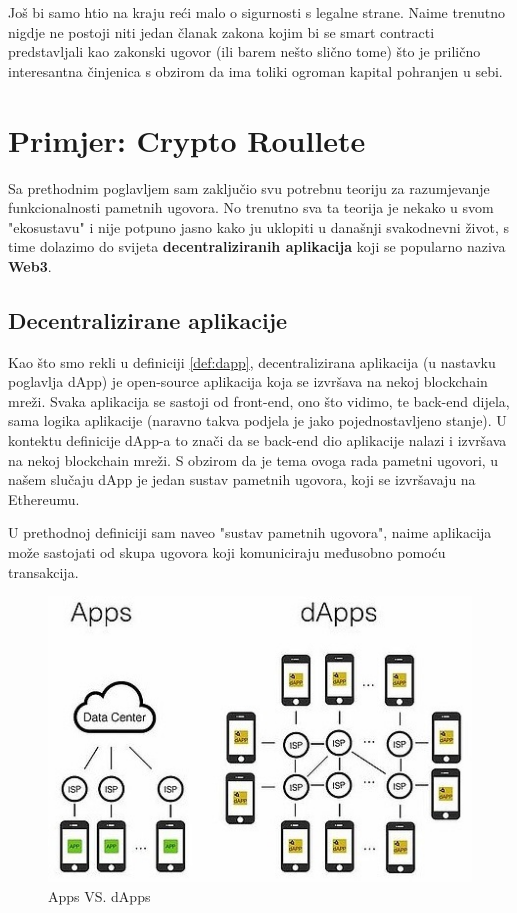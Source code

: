 \documentclass[12pt]{report}
\begin{document}
Još bi samo htio na kraju reći malo o sigurnosti s legalne strane. Naime trenutno nigdje ne postoji niti jedan članak zakona kojim bi se smart contracti predstavljali kao zakonski ugovor (ili barem nešto slično tome) što je prilično interesantna činjenica s obzirom da ima toliki ogroman kapital pohranjen u sebi.
    
\chapter{Primjer: Crypto Roullete}

Sa prethodnim poglavljem sam zaključio svu potrebnu teoriju za razumjevanje funkcionalnosti pametnih ugovora. No trenutno sva ta teorija je nekako u svom "ekosustavu" i nije potpuno jasno kako ju uklopiti u današnji svakodnevni život, s time dolazimo do svijeta \textbf{decentraliziranih aplikacija} koji se popularno naziva \textbf{Web3}.

\section{Decentralizirane aplikacije}

Kao što smo rekli u definiciji \ref{def:dapp}, decentralizirana aplikacija (u nastavku poglavlja dApp) je open-source aplikacija koja se izvršava na nekoj blockchain mreži. Svaka aplikacija se sastoji od front-end, ono što vidimo, te back-end dijela, sama logika aplikacije (naravno takva podjela je jako pojednostavljeno stanje). U kontektu definicije dApp-a to znači da se back-end dio aplikacije nalazi i izvršava na nekoj blockchain mreži. S obzirom da je tema ovoga rada pametni ugovori, u našem slučaju dApp je jedan sustav pametnih ugovora, koji se izvršavaju na Ethereumu. 

\begin{napomena}
U prethodnoj definiciji sam naveo "sustav pametnih ugovora", naime aplikacija može sastojati od skupa ugovora koji komuniciraju međusobno pomoću transakcija.
\end{napomena}

\begin{figure}[h]
\centering
\includegraphics[scale=0.6]{AppsVSdApps}
\caption{Apps VS. dApps}
\label{fig:appvsdapp}
\end{figure}
\end{document}
